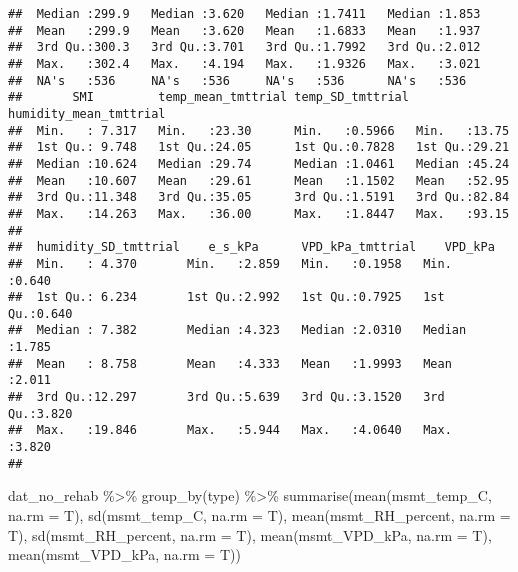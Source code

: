 \documentclass[
]{article}
\newenvironment{Shaded}{\begin{snugshade}}{\end{snugshade}}
\newcommand{\AttributeTok}[1]{\textcolor[rgb]{0.77,0.63,0.00}{#1}}
\newcommand{\FunctionTok}[1]{\textcolor[rgb]{0.00,0.00,0.00}{#1}}
\newcommand{\NormalTok}[1]{#1}
\newcommand{\SpecialCharTok}[1]{\textcolor[rgb]{0.00,0.00,0.00}{#1}}
\begin{document}
\begin{verbatim}
##  Median :299.9   Median :3.620   Median :1.7411   Median :1.853  
##  Mean   :299.9   Mean   :3.620   Mean   :1.6833   Mean   :1.937  
##  3rd Qu.:300.3   3rd Qu.:3.701   3rd Qu.:1.7992   3rd Qu.:2.012  
##  Max.   :302.4   Max.   :4.194   Max.   :1.9326   Max.   :3.021  
##  NA's   :536     NA's   :536     NA's   :536      NA's   :536    
##       SMI         temp_mean_tmttrial temp_SD_tmttrial humidity_mean_tmttrial
##  Min.   : 7.317   Min.   :23.30      Min.   :0.5966   Min.   :13.75         
##  1st Qu.: 9.748   1st Qu.:24.05      1st Qu.:0.7828   1st Qu.:29.21         
##  Median :10.624   Median :29.74      Median :1.0461   Median :45.24         
##  Mean   :10.607   Mean   :29.61      Mean   :1.1502   Mean   :52.95         
##  3rd Qu.:11.348   3rd Qu.:35.05      3rd Qu.:1.5191   3rd Qu.:82.84         
##  Max.   :14.263   Max.   :36.00      Max.   :1.8447   Max.   :93.15         
##                                                                             
##  humidity_SD_tmttrial    e_s_kPa      VPD_kPa_tmttrial    VPD_kPa     
##  Min.   : 4.370       Min.   :2.859   Min.   :0.1958   Min.   :0.640  
##  1st Qu.: 6.234       1st Qu.:2.992   1st Qu.:0.7925   1st Qu.:0.640  
##  Median : 7.382       Median :4.323   Median :2.0310   Median :1.785  
##  Mean   : 8.758       Mean   :4.333   Mean   :1.9993   Mean   :2.011  
##  3rd Qu.:12.297       3rd Qu.:5.639   3rd Qu.:3.1520   3rd Qu.:3.820  
##  Max.   :19.846       Max.   :5.944   Max.   :4.0640   Max.   :3.820  
## 
\end{verbatim}

\begin{Shaded}
\begin{Highlighting}[]
\NormalTok{dat\_no\_rehab }\SpecialCharTok{\%\textgreater{}\%}
  \FunctionTok{group\_by}\NormalTok{(type) }\SpecialCharTok{\%\textgreater{}\%}
  \FunctionTok{summarise}\NormalTok{(}\FunctionTok{mean}\NormalTok{(msmt\_temp\_C, }\AttributeTok{na.rm =}\NormalTok{ T),}
            \FunctionTok{sd}\NormalTok{(msmt\_temp\_C, }\AttributeTok{na.rm =}\NormalTok{ T),}
            \FunctionTok{mean}\NormalTok{(msmt\_RH\_percent, }\AttributeTok{na.rm =}\NormalTok{ T),}
            \FunctionTok{sd}\NormalTok{(msmt\_RH\_percent, }\AttributeTok{na.rm =}\NormalTok{ T),}
            \FunctionTok{mean}\NormalTok{(msmt\_VPD\_kPa, }\AttributeTok{na.rm =}\NormalTok{ T),}
            \FunctionTok{mean}\NormalTok{(msmt\_VPD\_kPa, }\AttributeTok{na.rm =}\NormalTok{ T))}
\end{Highlighting}
\end{Shaded}
\end{document}
